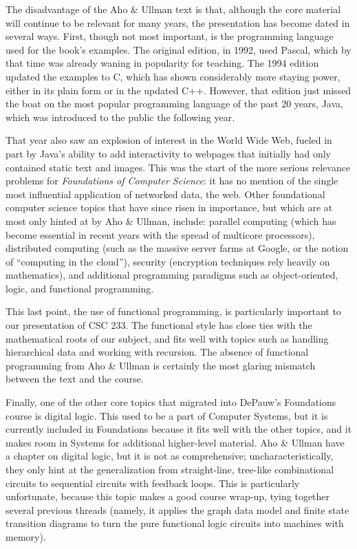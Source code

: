 The disadvantage of the Aho \& Ullman text is that, although the core material will continue to be relevant for many years, the presentation has become dated in several ways. First, though not most important, is the programming language used for the book's examples. The original edition, in 1992, used Pascal, which by that time was already waning in popularity for teaching. The 1994 edition updated the examples to C, which has shown considerably more staying power, either in its plain form or in the updated C++. However, that edition just missed the boat on the most popular programming language of the past 20 years, Java, which was introduced to the public the following year.

That year also saw an explosion of interest in the World Wide Web, fueled in part by Java's ability to add interactivity to webpages that initially had only contained static text and images. This was the start of the more serious relevance problems for \textit{Foundations of Computer Science}: it has no mention of the single most influential application of networked data, the web. Other foundational computer science topics that have since risen in importance, but which are at most only hinted at by Aho \& Ullman, include: parallel computing (which has become essential in recent years with the spread of multicore processors), distributed computing (such as the massive server farms at Google, or the notion of ``computing in the cloud''), security (encryption techniques rely heavily on mathematics), and additional programming paradigms such as object-oriented, logic, and functional programming.

This last point, the use of functional programming, is particularly important to our presentation of CSC 233. The functional style has close ties with the mathematical roots of our subject, and fits well with topics such as handling hierarchical data and working with recursion. The absence of functional programming from Aho \& Ullman is certainly the most glaring mismatch between the text and the course.

Finally, one of the other core topics that migrated into DePauw's Foundations course is digital logic. This used to be a part of Computer Systems, but it is currently included in Foundations because it fits well with the other topics, and it makes room in Systems for additional higher-level material. Aho \& Ullman have a chapter on digital logic, but it is not as comprehensive; uncharacteristically, they only hint at the generalization from straight-line, tree-like combinational circuits to sequential circuits with feedback loops. This is particularly unfortunate, because this topic makes a good course wrap-up, tying together several previous threads (namely, it applies the graph data model and finite state transition diagrams to turn the pure functional logic circuits into machines with memory).
